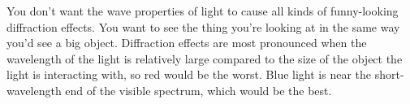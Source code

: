 You don't want the wave properties of light to cause all
kinds of funny-looking diffraction effects. You want to see
the thing you're looking at in the same way you'd see a big
object.  Diffraction effects are most pronounced when the
wavelength of the light is relatively large compared to the size of the
object the light is interacting with, so red would be the worst.
Blue light is near
the short-wavelength end of the visible spectrum, which would be the best.
